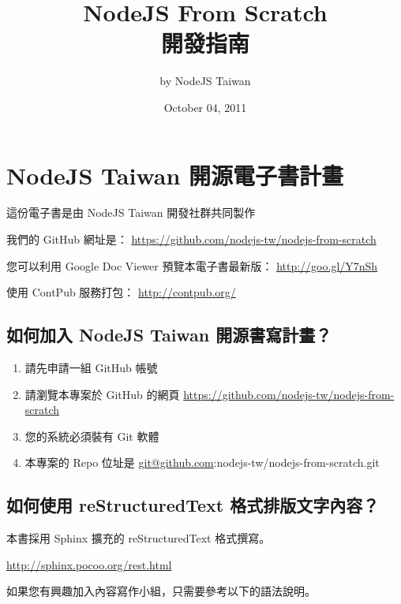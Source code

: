 \documentclass[a4paper,12pt,english]{sphinxmanual}
\title{NodeJS From Scratch\\開發指南}
\date{October 04, 2011}
\author{by NodeJS Taiwan}
\begin{document}
\maketitle
\tableofcontents
{}\label{index::doc}



\chapter{NodeJS Taiwan 開源電子書計畫}
\label{README:nodejs-from-scratch}\label{README::doc}\label{README:nodejs-taiwan}
這份電子書是由 NodeJS Taiwan 開發社群共同製作

我們的 GitHub 網址是：
\href{https://github.com/nodejs-tw/nodejs-from-scratch}{https://github.com/nodejs-tw/nodejs-from-scratch}

您可以利用 Google Doc Viewer 預覽本電子書最新版：
\href{http://goo.gl/Y7nSh}{http://goo.gl/Y7nSh}

使用 ContPub 服務打包：
\href{http://contpub.org/}{http://contpub.org/}


\section{如何加入 NodeJS Taiwan 開源書寫計畫？}
\label{README:id1}\begin{enumerate}
\item {} 
請先申請一組 GitHub 帳號

\item {} 
請瀏覽本專案於 GitHub 的網頁
\href{https://github.com/nodejs-tw/nodejs-from-scratch}{https://github.com/nodejs-tw/nodejs-from-scratch}

\item {} 
您的系統必須裝有 Git 軟體

\item {} 
本專案的 Repo 位址是
\href{mailto:git@github.com}{git@github.com}:nodejs-tw/nodejs-from-scratch.git

\end{enumerate}


\section{如何使用 reStructuredText 格式排版文字內容？}
\label{README:restructuredtext}
本書採用 Sphinx 擴充的 reStructuredText 格式撰寫。

\href{http://sphinx.pocoo.org/rest.html}{http://sphinx.pocoo.org/rest.html}

如果您有興趣加入內容寫作小組，只需要參考以下的語法說明。
\end{document}
